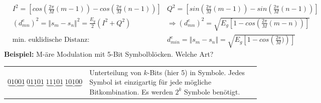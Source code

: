 \begin{align*}
&I^2 = \left[cos\left(\frac{2 \pi}{M}(m-1) \right)-cos\left(\frac{2 \pi}{M}(n-1) \right)  \right]  &Q^2 = \left[sin\left(\frac{2 \pi}{M}(m-1) \right)-sin\left(\frac{2 \pi}{M}(n-1) \right)  \right] \\ 
&\left( d^{e}_{mn} \right)^2  = \Vert s_m - s_n \Vert^2 = \frac{E_g}{2}(I^2 + Q^2) &\Rightarrow \left( d^{e}_{mn} \right)^2  = \sqrt{E_g \left[1-cos\left(\frac{2 \pi}{M}(m-n) \right)  \right] } \\
&\text{min. euklidische Distanz:} &d^e_{min} = \Vert s_m - s_n \Vert = \sqrt{E_g \left[1-cos\left(\frac{2 \pi}{M}) \right)  \right] }
\end{align*}
\textbf{Beispiel:} \quad M-äre Modulation mit 5-Bit Symbolblöcken. Welche Art?\\\vspace{6pt}
 \begin{tabular}{ll}
 \parbox{4cm}{
$\underbrace{01001}~ \underbrace{01101}~\underbrace{11101}~\underbrace{10100}$ }&
 \parbox{7cm}{
 Unterteilung von $k$-Bits (hier 5) in Symbole. Jedes Symbol ist einzigartig für jede mögliche Bitkombination. Es werden $2^k$ Symbole benötigt.
 }
 \end{tabular}\\\vspace{6pt}
